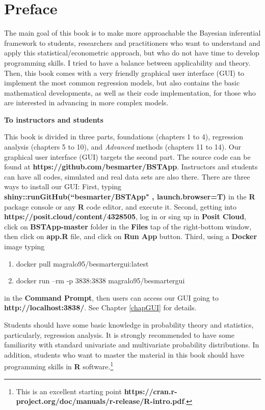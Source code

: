\chapter*{Preface}
The main goal of this book is to make more approachable the Bayesian inferential framework to students, researchers and practitioners who want to understand and apply this statistical/econometric approach, but who do not have time to develop programming skills. I tried to have a balance between applicability and theory. Then, this book comes with a very friendly graphical user interface (GUI) to implement the most common regression models, but also contains the basic mathematical developments, as well as their code implementation, for those who are interested in advancing in more complex models.

\textbf{To instructors and students}

This book is divided in three parts, foundations (chapters 1 to 4), regression analysis (chapters 5 to 10), and \textit{Advanced} methods (chapters 11 to 14). Our graphical user interface (GUI) targets the second part. The source code can be found at \textbf{https://github.com/besmarter/BSTApp}. Instructors and students can have all codes, simulated and real data sets are also there. There are three ways to install our GUI: First, typing \textbf{shiny::runGitHub(``besmarter/BSTApp" , launch.browser=T)} in the \textbf{R} package console or any \textbf{R} code editor, and execute it. Second, getting into \textbf{https://posit.cloud/content/4328505}, log in or sing up in \textbf{Posit Cloud}, click on \textbf{BSTApp-master} folder in the \textbf{Files} tap of the right-bottom window, then click on \textbf{app.R} file, and click on \textbf{Run App} button. Third, using a \textbf{Docker} image typing
\begin{enumerate}
	\item docker pull magralo95/besmartergui:latest
	\item docker run --rm -p 3838:3838 magralo95/besmartergui
\end{enumerate}
in the \textbf{Command Prompt}, then users can access our GUI going to \textbf{http://localhost:3838/}. See Chapter \ref{chapGUI} for details.

Students should have some basic knowledge in probability theory and statistics, particularly, regression analysis. It is strongly recommended to have some familiarity with standard univariate and multivariate probability distributions. In addition, students who want to master the material in this book should have programming skills in \textbf{R} software.\footnote{This is an excellent starting point \textbf{https://cran.r-project.org/doc/manuals/r-release/R-intro.pdf}.} 


